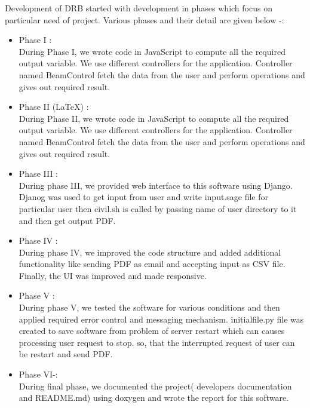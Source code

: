 Development of DRB started with development in phases which focus on particular need of project.
Various phases and their detail are given below -:
\begin{itemize}
\item Phase I : \\
	During Phase I, we wrote code in JavaScript to compute all the required output variable.
We use different controllers for the application. Controller named BeamControl fetch the data from the user and perform operations and gives out required result.
\item Phase II (\LaTeX{}) : \\
	During Phase II, we wrote code in JavaScript to compute all the required output variable.
We use different controllers for the application. Controller named BeamControl fetch the data from the user and perform operations and gives out required result.
	
\item Phase III : \\
	During phase III, we provided web interface to this software using Django. Djanog was used
	to get input from user and write input.sage file for particular user then civil.sh 
	is called by passing name of user directory to it and then get output PDF.
\item Phase IV : \\
	During phase IV, we improved the code structure and added additional 
	functionality like sending PDF as email and accepting input as CSV file.
	Finally, the UI was improved and made responsive.
\item Phase V : \\
During phase V, we tested the software for various conditions and then applied required error control and messaging 
mechanism. initialfile.py file was created to save software from problem of server restart which can causes processing user request to stop. so, that 
the interrupted request of user can be restart and send PDF.
\item Phase VI-: \\ 
During final phase, we documented the project( developers documentation and README.md) using doxygen and wrote the report for this software.    
\end{itemize}     

